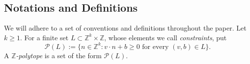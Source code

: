 \documentclass[a4paper,reqno,12pt]{amsart}
\theoremstyle{plain}
\theoremstyle{plain}
\theoremstyle{remark}
\theoremstyle{plain}
\newcommand{\cP}{\mathscr{P}}
\newcommand{\cp}{\mathbb{C}} %
\newcommand{\Z}{\mathbb{Z}}
\theoremstyle{plain}
\theoremstyle{plain}
\begin{document}
{ 
%
%

\subsection{Notations and Definitions}

We will adhere to a set of conventions and definitions throughout the paper. 
Let $k \geq 1$.
For a finite set $L\subset\Z^k\times\Z$, whose elements we call
\emph{constraints}, put
\[
\cP(L):=\{n\in\Z^k : v\cdot n+b\ge0 \text{ for every }(v,b)\in L\}.
\]
A \emph{$\Z$-polytope} is a set of the form $\cP(L)$. 

}
\end{document}
